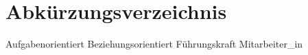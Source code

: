 

\chapter*{Abkürzungsverzeichnis}
\begin{acronym}[abbreviations]
 {Aufgabenorientiert}
 {Beziehungsorientiert}
 {Führungskraft}
 {Mitarbeiter\_in}
\end{acronym}


